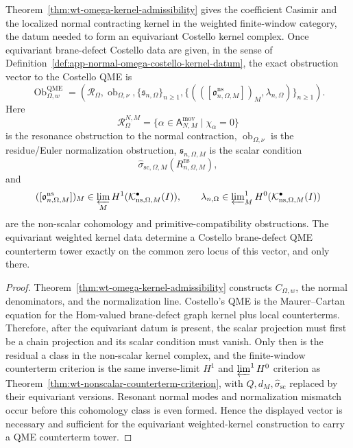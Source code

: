 \begin{cor}\label{cor:wt-omega-denominators-qme-boundary}
  Theorem~\ref{thm:wt-omega-kernel-admissibility} gives the
  coefficient Casimir and the localized normal contracting kernel in
  the weighted finite-window category, the datum needed to form an
  equivariant Costello kernel complex.  Once equivariant brane-defect
  Costello data are given, in the sense of
  Definition~\ref{def:app-normal-omega-costello-kernel-datum}, the
  exact obstruction vector to the Costello QME is
  \[
    \operatorname{Ob}^{\mathrm{QME}}_{\Omega,w}
      =
    \left(
      \mathcal R_{\Omega},
      \operatorname{ob}_{\Omega,\nu},
      \{\mathfrak s_{n,\Omega}\}_{n\geq1},
      \{(([\mathfrak o^{\mathrm{ns}}_{n,\Omega,M}])_M,
          \lambda_{n,\Omega})\}_{n\geq1}
    \right).
  \]
  Here
  \[
    \mathcal R_{\Omega}^{N,M}
      =
    \{\alpha\in\mathsf A^{\mathrm{mov}}_{N,M}
      \mid \chi_\alpha=0\}
  \]
  is the resonance obstruction to the normal contraction,
  \(\operatorname{ob}_{\Omega,\nu}\) is the residue/Euler normalization
  obstruction, \(\mathfrak s_{n,\Omega,M}\) is the scalar
  condition
  \[
    \widehat\sigma_{\mathrm{sc},\Omega,M}
      (R^{\mathrm{ns}}_{n,\Omega,M}),
  \]
  and
  \[
    ([\mathfrak o^{\mathrm{ns}}_{n,\Omega,M}])_M
      \in
    \varprojlim_M
    H^1(\mathcal K^\bullet_{\mathrm{ns},\Omega,M}(I)),
    \qquad
    \lambda_{n,\Omega}\in
    \varprojlim\nolimits^1_M
    H^0(\mathcal K^\bullet_{\mathrm{ns},\Omega,M}(I))
  \]
  are the non-scalar cohomology and primitive-compatibility obstructions.
  The equivariant weighted kernel data determine a Costello
  brane-defect QME counterterm tower exactly on the common zero locus of
  this vector, and only there.
\end{cor}

\begin{proof}
  Theorem~\ref{thm:wt-omega-kernel-admissibility} constructs
  \(C_{\Omega,w}\), the normal denominators, and the normalization line.
  Costello's QME is the Maurer--Cartan equation for the Hom-valued
  brane-defect graph kernel plus local counterterms.  Therefore, after the
  equivariant datum is present, the scalar projection must first be a
  chain projection and its scalar condition must vanish.  Only then is the
  residual a class in the non-scalar kernel complex, and the finite-window
  counterterm criterion is the same inverse-limit \(H^1\) and
  \(\varprojlim^1H^0\) criterion as
  Theorem~\ref{thm:wt-nonscalar-counterterm-criterion}, with
  \(Q,d_M,\widehat\sigma_{\mathrm{sc}}\) replaced by their equivariant
  versions.  Resonant normal modes and normalization mismatch occur before
  this cohomology class is even formed.  Hence the displayed vector is
  necessary and sufficient for the equivariant weighted-kernel construction
  to carry a QME counterterm tower.
\end{proof}

